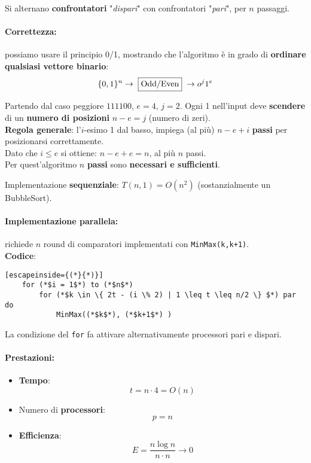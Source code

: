 Si alternano \textbf{confrontatori} "\textit{dispari}" con confrontatori "\textit{pari}", per $n$ passaggi.\\

\paragraph{Correttezza:} possiamo usare il principio 0/1, mostrando che l'algoritmo è in grado di \textbf{ordinare qualsiasi vettore binario}:
$$\{0,1\}^n \rightarrow \; \fbox{Odd/Even} \; \rightarrow o^j 1^e  $$

Partendo dal caso peggiore $111100$, $e=4$, $j=2$. Ogni 1 nell'input deve \textbf{scendere} di un \textbf{numero di posizioni} $n-e=j$ (numero di zeri).\\

\textbf{Regola generale}: l'$i$-esimo 1 dal basso, impiega (al più) $n-e+i$ \textbf{passi} per posizionarsi correttamente.\\
Dato che $i \leq e$ si ottiene: $n-e+e = n$, al più $n$ passi.\\

Per quest'algoritmo $n$ \textbf{passi} sono \textbf{necessari e sufficienti}.

\newpage

Implementazione \textbf{sequenziale}: $T(n,1) = O(n^2)$ (sostanzialmente un BubbleSort).\\

\paragraph{Implementazione parallela:} richiede $n$ round di comparatori implementati con \texttt{MinMax(k,k+1)}. \\

\textbf{Codice}: 
\begin{lstlisting}[escapeinside={(*}{*)}]
	for (*$i = 1$*) to (*$n$*)
		for (*$k \in \{ 2t - (i \% 2) | 1 \leq t \leq n/2 \} $*) par do
			MinMax((*$k$*), (*$k+1$*) )
\end{lstlisting}

La condizione del \texttt{for} fa attivare alternativamente processori pari e dispari.\\

\paragraph{Prestazioni: }
\begin{itemize}
	\item \textbf{Tempo}: 
	$$ t = n \cdot 4 = O(n) $$
	\item Numero di \textbf{processori}: 
	$$ p = n $$
	\item \textbf{Efficienza}: 
	$$ E = \frac{n \log n}{n \cdot n} \rightarrow 0 $$
\end{itemize}


